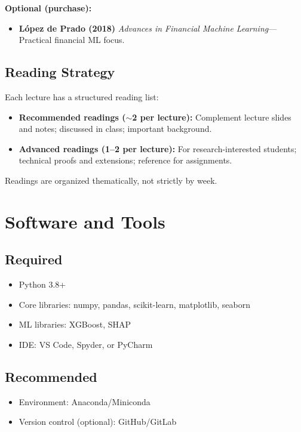\documentclass[11pt,a4paper]{article}
\begin{document}
\textbf{Optional (purchase):}
\begin{itemize}[leftmargin=*]
    \item \textbf{L\'{o}pez de Prado (2018)} \textit{Advances in Financial Machine Learning}---Practical financial ML focus.
\end{itemize}

\subsection{Reading Strategy}

Each lecture has a structured reading list:
\begin{itemize}[leftmargin=*]
    \item \textbf{Recommended readings ($\sim$2 per lecture):} Complement lecture slides and notes; discussed in class; important background.
    \item \textbf{Advanced readings (1--2 per lecture):} For research-interested students; technical proofs and extensions; reference for assignments.
\end{itemize}

Readings are organized thematically, not strictly by week.

\section{Software and Tools}

\subsection{Required}
\begin{itemize}[leftmargin=*]
    \item Python 3.8+
    \item Core libraries: numpy, pandas, scikit-learn, matplotlib, seaborn
    \item ML libraries: XGBoost, SHAP
    \item IDE: VS Code, Spyder, or PyCharm
\end{itemize}

\subsection{Recommended}
\begin{itemize}[leftmargin=*]
    \item Environment: Anaconda/Miniconda
    \item Version control (optional): GitHub/GitLab
\end{itemize}
\end{document}

